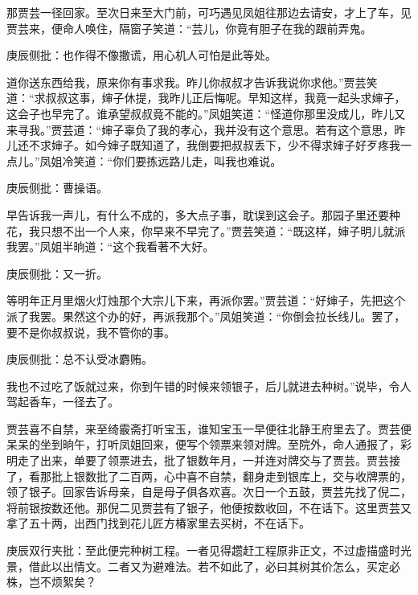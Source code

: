 \begin{parag}
    那贾芸一径回家。至次日来至大门前，可巧遇见凤姐往那边去请安，才上了车，见贾芸来，便命人唤住，隔窗子笑道：“芸儿，你竟有胆子在我的跟前弄鬼。\begin{note}庚辰侧批：也作得不像撒谎，用心机人可怕是此等处。\end{note}道你送东西给我，原来你有事求我。昨儿你叔叔才告诉我说你求他。”贾芸笑道：“求叔叔这事，婶子休提，我昨儿正后悔呢。早知这样，我竟一起头求婶子，这会子也早完了。谁承望叔叔竟不能的。”凤姐笑道：“怪道你那里没成儿，昨儿又来寻我。”贾芸道：“婶子辜负了我的孝心，我并没有这个意思。若有这个意思，昨儿还不求婶子。如今婶子既知道了，我倒要把叔叔丢下，少不得求婶子好歹疼我一点儿。”凤姐冷笑道：“你们要拣远路儿走，叫我也难说。\begin{note}庚辰侧批：曹操语。\end{note}早告诉我一声儿，有什么不成的，多大点子事，耽误到这会子。那园子里还要种花，我只想不出一个人来，你早来不早完了。”贾芸笑道：“既这样，婶子明儿就派我罢。”凤姐半晌道：“这个我看著不大好。\begin{note}庚辰侧批：又一折。\end{note}等明年正月里烟火灯烛那个大宗儿下来，再派你罢。”贾芸道：“好婶子，先把这个派了我罢。果然这个办的好，再派我那个。”凤姐笑道：“你倒会拉长线儿。罢了，要不是你叔叔说，我不管你的事。\begin{note}庚辰侧批：总不认受冰麝贿。\end{note}我也不过吃了饭就过来，你到午错的时候来领银子，后儿就进去种树。”说毕，令人驾起香车，一径去了。
\end{parag}


\begin{parag}
    贾芸喜不自禁，来至绮霰斋打听宝玉，谁知宝玉一早便往北静王府里去了。贾芸便呆呆的坐到晌午，打听凤姐回来，便写个领票来领对牌。至院外，命人通报了，彩明走了出来，单要了领票进去，批了银数年月，一并连对牌交与了贾芸。贾芸接了，看那批上银数批了二百两，心中喜不自禁，翻身走到银库上，交与收牌票的，领了银子。回家告诉母亲，自是母子俱各欢喜。次日一个五鼓，贾芸先找了倪二，将前银按数还他。那倪二见贾芸有了银子，他便按数收回，不在话下。这里贾芸又拿了五十两，出西门找到花儿匠方椿家里去买树，不在话下。\begin{note}庚辰双行夹批：至此便完种树工程。一者见得趱赶工程原非正文，不过虚描盛时光景，借此以出情文。二者又为避难法。若不如此了，必曰其树其价怎么，买定必株，岂不烦絮矣？\end{note}
\end{parag}


